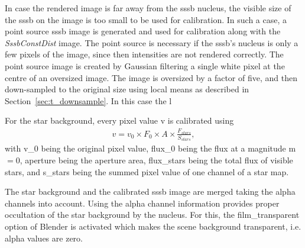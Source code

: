In case the rendered image is far away from the \gls{sssb} nucleus, the visible size of the \gls{sssb} on the image is too small to be used for calibration. In such a case, a point source \gls{sssb} image is generated and used for calibration along with the \textit{SssbConstDist} image. The point source is necessary if the \gls{sssb}'s nucleus is only a few pixels of the image, since then intensities are not rendered correctly. The point source image is created by Gaussian filtering a single white pixel at the centre of an oversized image. The image is oversized by a factor of five, and then down-sampled to the original size using local means as described in Section~\ref{sec:t_downsample}. In this case the l

For the star background, every pixel value \gls{v} is calibrated using
\begin{align}
        v = v_0 \times F_0 \times A \times \frac{F_{stars}}{S_{stars}}, \label{eq:comp_cal_starmap}
\end{align}
with \gls{v_0} being the original pixel value, \gls{flux_0} being the flux at a magnitude \gls{m}$ = 0$, \gls{aperture} being the aperture area, \gls{flux_stars} being the total flux of visible stars, and \gls{s_stars} being the summed pixel value of one channel of a star map.

The star background and the calibrated \gls{sssb} image are merged taking the alpha channels into account. Using the alpha channel information provides proper occultation of the star background by the nucleus. For this, the film\_transparent option of Blender is activated which makes the scene background transparent, i.e. alpha values are zero.


